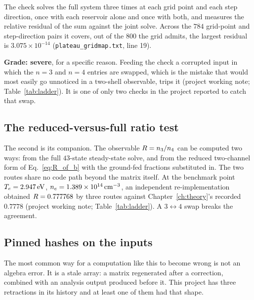 The check solves the full system three times at each grid point and each step
direction, once with each reservoir alone and once with both, and measures the
relative residual of the sum against the joint solve. Across the $784$
grid-point and step-direction pairs it covers, out of the $800$ the grid admits,
the largest residual is $3.075\times10^{-14}$
(\texttt{plateau\_gridmap.txt}, line 19).

\textbf{Grade: severe}, for a specific reason. Feeding the check a corrupted
input in which the $n=3$ and $n=4$ entries are swapped, which is the mistake
that would most easily go unnoticed in a two-shell observable, trips it
(project working note; Table~\ref{tab:ladder}). It is one of only two checks in the
project reported to catch that swap.

\subsection{The reduced-versus-full ratio test}

The second is its companion. The observable $R = n_3/n_4$ can be computed
two ways: from the full $43$-state steady-state solve, and from the reduced
two-channel form of Eq.~\eqref{eq:R_of_b} with the ground-fed fractions
substituted in. The two routes share no code path beyond the matrix itself. At
the benchmark point $T_e = \SI{2.947}{\electronvolt}$, $n_e = \SI{1.389e14}{\per\cubic\centi\metre}$, an independent
re-implementation obtained $R = 0.777768$ by three routes against
Chapter~\ref{ch:theory}'s recorded $0.7778$
(project working note; Table~\ref{tab:ladder}). A $3\leftrightarrow4$ swap breaks the
agreement.

\subsection{Pinned hashes on the inputs}

The most common way for a computation like this to become wrong is not an
algebra error. It is a stale array: a matrix regenerated after a correction,
combined with an analysis output produced before it. This project has three
retractions in its history and at least one of them had that shape.

